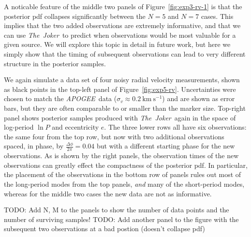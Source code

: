 \documentclass[manuscript, letterpaper]{aastex6}
\newcommand{\project}[1]{\textsl{#1}}
\newcommand{\acronym}[1]{{\small{#1}}}
\newcommand{\apogee}{\project{\acronym{APOGEE}}}
\newcommand{\samplername}{\project{The~Joker}}
\newcommand{\figname}{Figure}
\newcommand{\kms}{\mathrm{km}~\mathrm{s}^{-1}}
\newcommand{\todo}[1]{{\color{red}TODO: #1}}
\begin{document}
A noticable feature of the middle two panels of \figname~\ref{fig:exp3-rv-1} is
that the posterior pdf collapses significantly between the $N=5$ and $N=7$
cases.
This implies that the two added observations are extremely informative, and that
we can use \samplername\ to predict when observations would be most valuable for
a given source.
We will explore this topic in detail in future work, but here we simply show
that the timing of subsequent observations can lead to very different
structure in the posterior samples.

We again simulate a data set of four noisy radial velocity measurements, shown
as black points in the top-left panel of \figname~\ref{fig:exp5-rv}.
Uncertainties were chosen to match the \apogee\ data ($\sigma_v \approx
0.2~\kms$) and are shown as error bars, but they are often comparable to or
smaller than the marker size.
Top-right panel shows posterior samples produced with \samplername\ again in the
space of log-period $\ln P$ and eccentricity $e$.
The three lower rows all have six observations: the same four from the top row,
but now with two additional observations spaced, in phase, by $\frac{\Delta
\phi}{2 \pi} = 0.04$ but with a different starting phase for the new
observations.
As is shown by the right panels, the observation times of the new observations
can greatly effect the compactness of the posterior pdf.
In particular, the placement of the observations in the bottom row of panels
rules out most of the long-period modes from the top panels, \emph{and} many of
the short-period modes, whereas for the middle two cases the new data are not as
informative.

\todo{Add N, M to the panels to show the number of data points and the number of
surviving samples!}
\todo{Add another panel to the figure with the subsequent two observations at a
bad postion (doesn't collapse pdf)}
\end{document}
